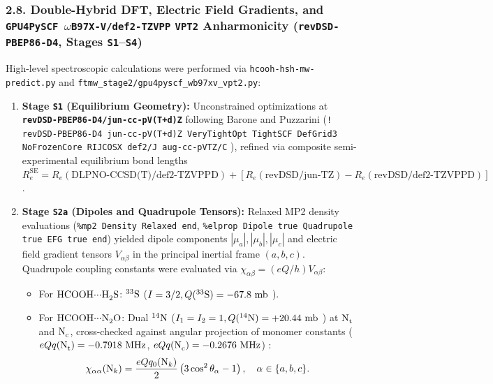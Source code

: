 \documentclass[journal=jpclcd,manuscript=article]{achemso}
\begin{document}
\subsubsection{2.8. Double-Hybrid DFT, Electric Field Gradients, and \texttt{GPU4PySCF $\omega$B97X-V/def2-TZVPP} \texttt{VPT2} Anharmonicity (\texttt{revDSD-PBEP86-D4}, Stages \texttt{S1}--\texttt{S4})}
High-level spectroscopic calculations were performed via \texttt{hcooh-hsh-mw-predict.py} and \texttt{ftmw\_stage2/gpu4pyscf\_wb97xv\_vpt2.py}:
\begin{enumerate}
  \item \textbf{Stage \texttt{S1} (Equilibrium Geometry):} Unconstrained optimizations at \textbf{\texttt{revDSD-PBEP86-D4/jun-cc-pV(T+d)Z}} \cite{Santra2019, Caldeweyher2019, Papajak2011, Dunning1989, Kendall1992, Dunning2001} following Barone and Puzzarini \cite{Barone2020, Puzzarini2021, Melli2024} (\texttt{! revDSD-PBEP86-D4 jun-cc-pV(T+d)Z VeryTightOpt TightSCF DefGrid3 NoFrozenCore RIJCOSX def2/J aug-cc-pVTZ/C} \cite{Neese2009, Weigend2006, Hattig2005}), refined via composite semi-experimental equilibrium bond lengths $R_e^{\mathrm{SE}} = R_e(\text{DLPNO-CCSD(T)/def2-TZVPPD}) + [R_e(\text{revDSD/jun-TZ}) - R_e(\text{revDSD/def2-TZVPPD})]$.
  \item \textbf{Stage \texttt{S2a} (Dipoles and Quadrupole Tensors):} Relaxed MP2 density evaluations (\texttt{\%mp2 Density Relaxed end}, \texttt{\%elprop Dipole true Quadrupole true EFG true end}) yielded dipole components $|\mu_a|, |\mu_b|, |\mu_c|$ and electric field gradient tensors $V_{\alpha\beta}$ in the principal inertial frame $(a,b,c)$. Quadrupole coupling constants were evaluated via $\chi_{\alpha\beta} = (eQ/h)V_{\alpha\beta}$:
  \begin{itemize}
    \item For $\ce{HCOOH\bond{...}H2S}$: $^{33}\ce{S}$ ($I = 3/2, Q(^{33}\ce{S}) = -67.8\text{ mb}$ \cite{Pyykko2018}).
    \item For $\ce{HCOOH\bond{...}N2O}$: Dual $^{14}\ce{N}$ ($I_1 = I_2 = 1, Q(^{14}\ce{N}) = +20.44\text{ mb}$ \cite{Pyykko2018}) at $\ce{N_t}$ and $\ce{N_c}$, cross-checked against angular projection of monomer constants ($eQq(\ce{N_t}) = -0.7918\text{ MHz}$, $eQq(\ce{N_c}) = -0.2676\text{ MHz}$) \cite{Pyykko2018, Duarte2017}:
    \begin{equation}
      \chi_{\alpha\alpha}(\ce{N}_k) = \frac{eQq_0(\ce{N}_k)}{2}\left(3\cos^2\theta_\alpha - 1\right), \quad \alpha \in \{a,b,c\}.
    \end{equation}
  \end{itemize}

\end{enumerate}
\end{document}
